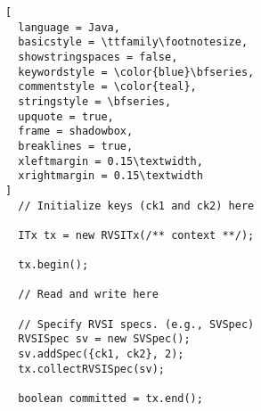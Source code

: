 \begin{lstlisting}[
  language = Java,
  basicstyle = \ttfamily\footnotesize,
  showstringspaces = false,
  keywordstyle = \color{blue}\bfseries,
  commentstyle = \color{teal},
  stringstyle = \bfseries,
  upquote = true,
  frame = shadowbox,
  breaklines = true,
  xleftmargin = 0.15\textwidth,
  xrightmargin = 0.15\textwidth
]
  // Initialize keys (ck1 and ck2) here

  ITx tx = new RVSITx(/** context **/);

  tx.begin();

  // Read and write here

  // Specify RVSI specs. (e.g., SVSpec)
  RVSISpec sv = new SVSpec();
  sv.addSpec({ck1, ck2}, 2);
  tx.collectRVSISpec(sv);

  boolean committed = tx.end();
\end{lstlisting}
